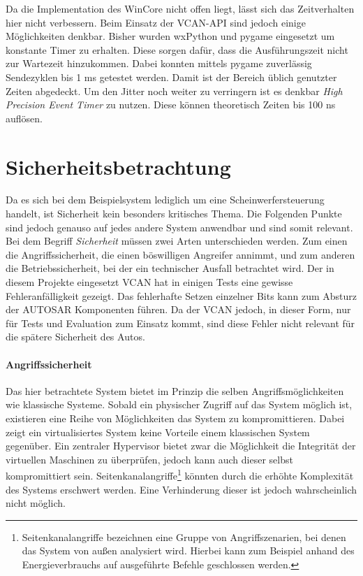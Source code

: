 \documentclass[
  a4paper,					    %
  twoside,
  DIV=calc,     				%
  bibliography=totoc,
  cleardoublepage=empty,
  ngerman,     					%
  final       					%
]{scrbook}
\begin{document}
Da die Implementation des WinCore nicht offen liegt, lässt sich das Zeitverhalten hier nicht verbessern. Beim Einsatz der VCAN-API sind jedoch einige Möglichkeiten denkbar. Bisher wurden wxPython und pygame eingesetzt um konstante Timer zu erhalten. Diese sorgen dafür, dass die Ausführungszeit nicht zur Wartezeit hinzukommen. Dabei konnten mittels pygame zuverlässig Sendezyklen bis 1 ms getestet werden. Damit ist der Bereich üblich genutzter Zeiten abgedeckt. Um den Jitter noch weiter zu verringern ist es denkbar \emph{High Precision Event Timer} zu nutzen. Diese können theoretisch Zeiten bis 100 ns auflösen.



\section{Sicherheitsbetrachtung}
\label{sec:Sicherheit_Beispiel}
Da es sich bei dem Beispielsystem lediglich um eine Scheinwerfersteuerung handelt, ist Sicherheit kein besonders kritisches Thema. Die Folgenden Punkte sind jedoch genauso auf jedes andere System anwendbar und sind somit relevant. Bei dem Begriff \emph{Sicherheit} müssen zwei Arten unterschieden werden. Zum einen die Angriffssicherheit, die einen böswilligen Angreifer annimmt, und zum anderen die Betriebssicherheit, bei der ein technischer Ausfall betrachtet wird. Der in diesem Projekte eingesetzt VCAN hat in einigen Tests eine gewisse Fehleranfälligkeit gezeigt. Das fehlerhafte Setzen einzelner Bits kann zum Absturz der AUTOSAR Komponenten führen. Da der VCAN jedoch, in dieser Form, nur für Tests und Evaluation zum Einsatz kommt, sind diese Fehler nicht relevant für die spätere Sicherheit des Autos.

\paragraph{Angriffssicherheit}
Das hier betrachtete System bietet im Prinzip die selben Angriffsmöglichkeiten wie klassische Systeme. Sobald ein physischer Zugriff auf das System möglich ist, existieren eine Reihe von Möglichkeiten das System zu kompromittieren. Dabei zeigt ein virtualisiertes System keine Vorteile einem klassischen System gegenüber. Ein zentraler Hypervisor bietet zwar die Möglichkeit die Integrität der virtuellen Maschinen zu überprüfen, jedoch kann auch dieser selbst kompromittiert sein. Seitenkanalangriffe\footnote{Seitenkanalangriffe bezeichnen eine Gruppe von Angriffszenarien, bei denen das System von außen analysiert wird. Hierbei kann zum Beispiel anhand des Energieverbrauchs auf ausgeführte Befehle geschlossen werden.} könnten durch die erhöhte Komplexität des Systems erschwert werden. Eine Verhinderung dieser ist jedoch wahrscheinlich nicht möglich.
\end{document}
